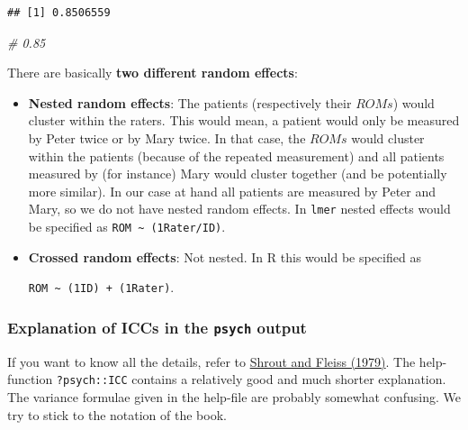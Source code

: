 \documentclass[
]{article}
\newenvironment{Shaded}{\begin{snugshade}}{\end{snugshade}}
\newcommand{\CommentTok}[1]{\textcolor[rgb]{0.56,0.35,0.01}{\textit{#1}}}
\begin{document}
\begin{verbatim}
## [1] 0.8506559
\end{verbatim}

\begin{Shaded}
\begin{Highlighting}[]
\CommentTok{\# 0.85}
\end{Highlighting}
\end{Shaded}

There are basically \textbf{two different random effects}:

\begin{itemize}
\item
  \textbf{Nested random effects}: The patients (respectively their \(ROMs\)) would cluster within the raters.
  This would mean, a patient would only be measured by Peter twice or by Mary twice.
  In that case, the \(ROMs\) would cluster within the patients (because of the repeated measurement)
  and all patients measured by (for instance) Mary would cluster together (and be potentially more similar).
  In our case at hand all patients are measured by Peter and Mary, so we do not have nested random effects.
  In \texttt{lmer} nested effects would be specified as \texttt{ROM\ \textasciitilde{}\ (1\textbar{}Rater/ID)}.
\item
  \textbf{Crossed random effects}:
  Not nested.
  In R this would be specified as

  \texttt{ROM\ \textasciitilde{}\ (1\textbar{}ID)\ +\ (1\textbar{}Rater)}.
\end{itemize}

\subsubsection{\texorpdfstring{Explanation of ICCs in the \texttt{psych} output}{Explanation of ICCs in the psych output}}\label{explanation-of-iccs-in-the-psych-output}

If you want to know all the details, refer to \href{https://d1wqtxts1xzle7.cloudfront.net/50483847/syarat_reliabilitas_icc-libre.pdf?1479841049=&response-content-disposition=inline\%3B+filename\%3DIntraclass_Correlations_Uses_in_Assessin.pdf&Expires=1740684631&Signature=hHiFbcQD3PDVIyWDJ-bUhcm3WtsK19YhHm6FKtnafNdqsm9NhR6cr9lbCf~gVV5SYG1XlTwLlcfJkQ9Z-ahjmmNV893aWi5plo~yL4oZBEjrmFa9WCd7k6vzFTkri1Xbgfh~GyPARWXBtqABytovtL-RD1420Kw9qk150nw3-kUWcuvRiIc~r0y65XQaXf-V9mm~uXRFdUqec4Vs-Bwh~IrJfHWQASGgp8wZjzh2130MCP3-iaorxNn~79c~nm2f1aIl5WRqRXB6EIy8HlrNFpxNSt1pgTPZoZadEECM4qH395KLY5ijUnhoCDT9AmcOplPnFiC5t8dKW-n25ziofQ__&Key-Pair-Id=APKAJLOHF5GGSLRBV4ZA}{Shrout and Fleiss (1979)}.
The help-function \texttt{?psych::ICC} contains a relatively good and much shorter explanation.
The variance formulae given in the help-file are probably somewhat confusing.
We try to stick to the notation of the book.
\end{document}
